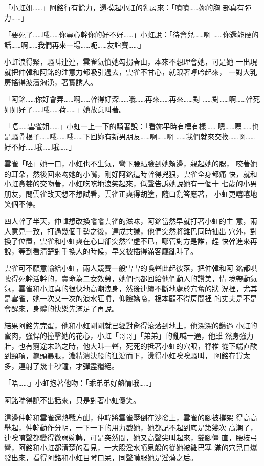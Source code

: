 「小虹姐……」阿銘行有餘力，還摸起小虹的乳房來：「嘖嘖……妳的胸
部真有彈力……」

「要死了……哦……你專心幹你的好不好……」小虹說：「待會兒……啊
……你還能硬的話……啊……我們再來一場……呃……友誼賽……」

小虹浪得緊，騷叫連連，雲雀氣憤她勾拐春山，本來不想理會她，可是她
一出現就把仲韓和阿銘的注意力都吸引過去，雲雀不甘心，就跟著哼吟起來，
一對大乳房搖得波濤洶湧，著實誘人。

「阿銘……你好會弄……啊……幹得好深……哦……再來……再來……對
……對……啊……幹死姐姐好了……哦……荷……」她故意叫著。

「唔……雲雀姐……」小虹一上一下的騎著說：「看妳平時有模有樣……
嗯……嗯……也是騷骨根子……哦……哦……下回妳有新男朋友……啊……啊
……我們就來交換……啊……好不好……哦……哦……」

雲雀「呸」她一口，小虹也不生氣，彎下腰貼臉到她頰邊，親起她的腮，
咬著她的耳朵，然後回來吻她的小嘴，剛好阿銘這時幹得兇狠，雲雀全身都痛
快，就和小虹貪婪的交吻著，小虹吃吃地浪笑起來，低聲告訴她說她有一個十
七歲的小男朋友，問雲雀改天想不想試看，雲雀正爽得胡塗，隨口亂答應著，
小虹更嘻嘻地笑個不停。

四人幹了半天，仲韓想改換嚐嚐雲雀的滋味，阿銘當然早就打著小虹的主
意，兩人意見一致，打過幾個手勢之後，達成共識，他們突然將雞巴同時抽出
穴外，對換了位置，雲雀和小虹爽在心口卻突然空虛不已，哪管對方是誰，趕
快幹進來再說，等到看清楚對手換人的時候，早又被插得滿客廳亂叫了。

雲雀可不願意輸給小虹，兩人競賽一般雪雪的喚聲此起彼落，把仲韓和阿
銘都哄唬得死幹活幹的，賣命為二女效勞，她們也都回給他們動人的讚美，情
境帶動氣氛，雲雀和小虹真的很快地高潮洩身，然後連續不斷地處於亢奮的狀
況裡，尤其是雲雀，她一次又一次的浪水狂噴，仰臉嬌啼，根本顧不得房間裡
的丈夫是不是會醒來，身體的快樂先滿足了再說。

結果阿銘先完蛋，他和小虹剛剛就已經對肏得滾落到地上，他深深的鑽過
小虹的蜜肉，強悍的撞擊她的花心，小虹「哥哥」「弟弟」的亂喊一通，他雖
然身強力壯，也有窮途末路之時，他大叫一聲，死死的抵著小虹的穴眼，脊椎
從下端直酸到頸項，龜頭暴脹，濃精潰決般的狂瀉而下，燙得小虹唉唉騷叫，
阿銘存貨太多，連射了幾十秒鐘，才彈盡糧絕。

「唔……」小虹抱著他吻：「乖弟弟好熱情哦……」

阿銘喘得說不出話來，只是對著小虹傻笑。

這邊仲韓和雲雀還熱戰方酣，仲韓將雲雀壓倒在沙發上，雲雀的腳被撐架
得高高舉起，仲韓動作分明，一下一下的用力戳她，她都記不起到底是第幾次
高潮了，連唉唷聲都變得微弱婉轉，可是突然間，她又高聲尖叫起來，雙腳僵
直，腰枝弓彎，阿銘和小虹都清楚的看見，一大股淫水噴泉般的從她被雞巴塞
滿的穴兒口爆發出來，看得阿銘和小虹目瞪口呆，同聲嘆服她是淫蕩之后。

